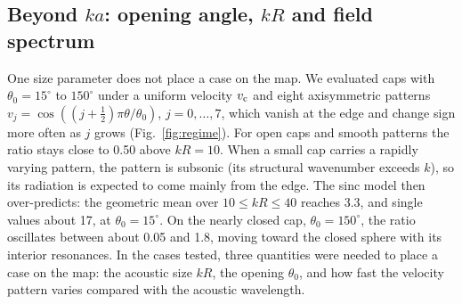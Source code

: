 \documentclass[preprint,12pt]{elsarticle}
\begin{document}
\subsection{Beyond $ka$: opening angle, $kR$ and field spectrum}
\label{sec:regime}
One size parameter does not place a case on the map. We evaluated caps with $\theta_0=15^\circ$ to $150^\circ$ under a uniform velocity $v_{\rm c}$ and eight axisymmetric patterns $v_j=\cos\!\left((j+\tfrac12)\pi\theta/\theta_0\right)$, $j=0,\dots,7$, which vanish at the edge and change sign more often as $j$ grows (Fig.~\ref{fig:regime}). For open caps and smooth patterns the ratio stays close to 0.50 above $kR=10$. %
When a small cap carries a rapidly varying pattern, the pattern is subsonic (its structural wavenumber exceeds $k$), so its radiation is expected to come mainly from the edge. The sinc model then over-predicts: the geometric mean over $10\le kR\le40$ reaches 3.3, and single values about 17, at $\theta_0=15^\circ$. %
On the nearly closed cap, $\theta_0=150^\circ$, the ratio oscillates between about 0.05 and 1.8, moving toward the closed sphere with its interior resonances. %
In the cases tested, three quantities were needed to place a case on the map: the acoustic size $kR$, the opening $\theta_0$, and how fast the velocity pattern varies compared with the acoustic wavelength.
\end{document}
